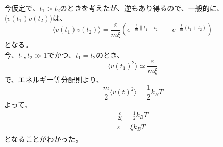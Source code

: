 \documentclass[10pt]{jreport}
\begin{document}
今仮定で、$t_1 > t_2$のときを考えたが、逆もあり得るので、一般的に、$\langle v(t_1)v(t_2) \rangle$は、
\begin{equation}
\underline{\langle v(t_1)v(t_2) \rangle =\frac{\varepsilon}{m\xi} (e^{-\frac{\xi}{m}\|t_1-t_2\|}-e^{-\frac{\xi}{m}(t_1+t_2)})}
\end{equation}
となる。\\
今、$t_1,t_2 \gg 1$でかつ、$t_1=t_2$のとき、
\begin{equation}
\langle v(t_1)^2 \rangle \simeq \frac{\varepsilon}{m\xi}
\end{equation}
で、エネルギー等分配則より、
\begin{equation}
\frac{m}{2} \langle v(t)^2 \rangle = \frac{1}{2}k_BT
\end{equation}
よって、
\begin{eqnarray}
\frac{\varepsilon}{2\xi} = \frac{1}{2}k_BT \nonumber \\
\underline{\varepsilon =\xi k_BT }
\end{eqnarray}
となることがわかった。
\end{document}
